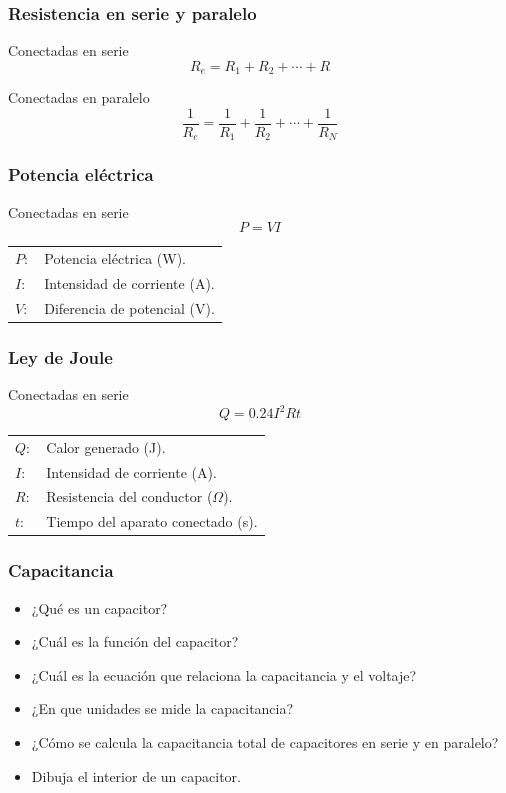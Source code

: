 \documentclass[handout]{beamer}
\begin{document}
\begin{frame}
  \frametitle{Resistencia en serie y paralelo}
  \begin{block}{Conectadas en serie}
    {\huge \[R_e = R_1 + R_2 + \cdots +R\]}
  \end{block}

  \begin{block}{Conectadas en paralelo}
    {\huge \[\frac{1}{R_e} = \frac{1}{R_1}+\frac{1}{R_2}+ \cdots + \frac{1}{R_N}\]}
  \end{block}

\end{frame}



\begin{frame}
  \frametitle{Potencia eléctrica }
  \begin{block}{Conectadas en serie}
    {\huge \[P = VI\]}
  \end{block}

  \begin{tabular}{ll}
    $P:$ & Potencia eléctrica (W).  \\ 
    $I:$ & Intensidad de corriente (A).  \\
    $V:$ & Diferencia de potencial (V).  \\ 
  \end{tabular}

\end{frame}


\begin{frame}
  \frametitle{Ley de Joule}
  \begin{block}{Conectadas en serie}
    {\huge \[Q =  0.24I^2Rt\]}
  \end{block}

  \begin{tabular}{ll}
    $Q:$ & Calor generado (J).  \\ 
    $I:$ & Intensidad de corriente (A).  \\ 
    $R:$ & Resistencia del conductor ($\Omega$). \\ 
    $t:$ & Tiempo del aparato conectado (s). \\ 
  \end{tabular}

\end{frame}



\begin{frame}
  \frametitle{Capacitancia}
  \begin{itemize}
  \item ¿Qué es un capacitor?
  \item ¿Cuál es la función del capacitor?
  \item ¿Cuál es la ecuación que relaciona la capacitancia y el voltaje?
  \item ¿En que unidades se mide la capacitancia?
  \item ¿Cómo se calcula la capacitancia total de capacitores en serie y en paralelo?
  \item Dibuja el interior de un capacitor.
  \end{itemize}
\end{frame}
\end{document}
